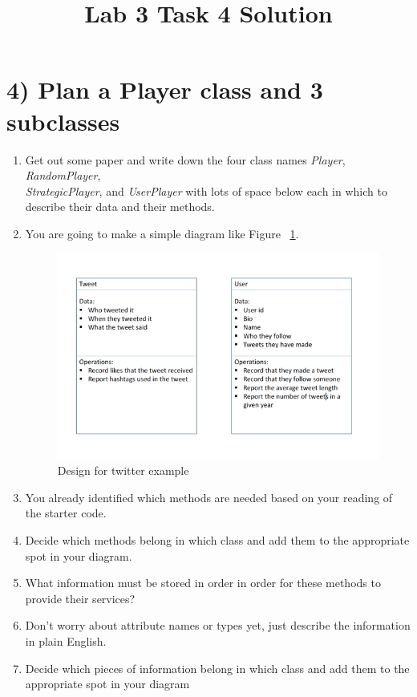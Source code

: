 \documentclass[12pt]{article}
\begin{document}
\title{Lab 3 Task 4 Solution}
\date{}
\maketitle


\section*{4) Plan a Player class and 3 subclasses}
\begin{enumerate}[1.]
    \item Get out some paper and write down the four class names \textit{Player},
    \textit{RandomPlayer},\\ \textit{StrategicPlayer}, and \textit{UserPlayer} with lots
    of space below each in which to describe their data and their methods.
    \item You are going to make a simple diagram like Figure ~\ref{fig:uml}.

    \begin{figure}
        \begin{center}
        \includegraphics[width=0.8\linewidth]{../../images/lab_3/uml.png}
        \end{center}
        \caption{Design for twitter example}
        \label{fig:uml}
    \end{figure}

    \item You already identified which methods are needed based on your reading of the
    starter code.
    \item Decide which methods belong in which class and add them to the appropriate
    spot in your diagram.
    \item What information must be stored in order in order for these methods to provide
    their services?
    \item Don’t worry about attribute names or types yet, just describe the information
    in plain English.
    \item Decide which pieces of information belong in which class and add them to the
    appropriate spot in your diagram
\end{enumerate}
\end{document}
